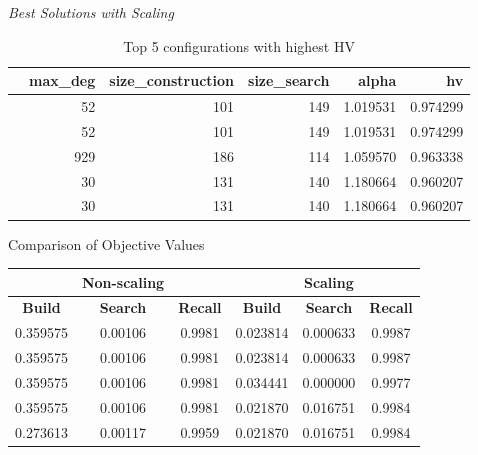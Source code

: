 \begin{frame}{\textit{Best Solutions with Scaling}}
    \begin{table}[h]
        \caption{Top 5 configurations with highest HV}
        \begin{tabular}{lrrrrr}
        \toprule
         & max\_deg & size\_construction & size\_search & alpha & hv \\
        \midrule
         & 52 & 101 & 149 & 1.019531 & 0.974299 \\
         & 52 & 101 & 149 & 1.019531 & 0.974299 \\
         & 929 & 186 & 114 & 1.059570 & 0.963338 \\
         & 30 & 131 & 140 & 1.180664 & 0.960207 \\
         & 30 & 131 & 140 & 1.180664 & 0.960207 \\
        \bottomrule
        \end{tabular}
    \end{table}
\end{frame}

\begin{frame}{Comparison of Objective Values}
    \begin{table}[h]
        \begin{tabular}{cccccc}
            \toprule
            & \textbf{Non-scaling} & & & \textbf{Scaling} & \\
            \midrule
            \textbf{Build} & \textbf{Search} & \textbf{Recall} & \textbf{Build} & \textbf{Search} & \textbf{Recall} \\
            0.359575 & 0.00106 & 0.9981 & 0.023814 & 0.000633 & 0.9987 \\
            0.359575 & 0.00106 & 0.9981 & 0.023814 & 0.000633 & 0.9987 \\
            0.359575 & 0.00106 & 0.9981 & 0.034441 & 0.000000 & 0.9977 \\
            0.359575 & 0.00106 & 0.9981 & 0.021870 & 0.016751 & 0.9984 \\
            0.273613 & 0.00117 & 0.9959 & 0.021870 & 0.016751 & 0.9984 \\
            \bottomrule
        \end{tabular}
    \end{table}
\end{frame}
